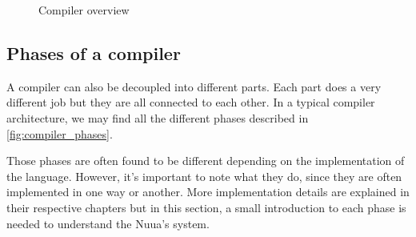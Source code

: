 \begin{figure}[H]
    \centering

    \caption{Compiler overview}
    \label{fig:compiler_overview}
\end{figure}

\subsection{Phases of a compiler}

A compiler can also be decoupled into different parts. Each part does a very different job but they are all connected to each other.
In a typical compiler architecture, we may find all the different phases described in \autoref{fig:compiler_phases}.

Those phases are often found to be different depending on the implementation of the language. However, it's important to note what they do,
since they are often implemented in one way or another. More implementation details are explained in their respective chapters but in this
section, a small introduction to each phase is needed to understand the Nuua's system.

